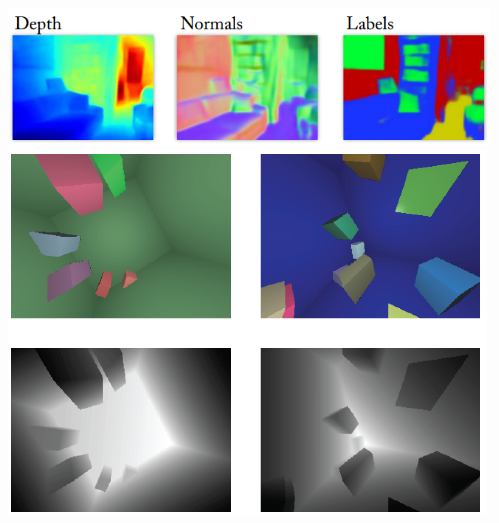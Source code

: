 \documentclass{beamer}
\begin{document}
\begin{frame}
\begin{columns}
\begin{column}{.4\textwidth}
\end{column}
\begin{column}{.6\textwidth}
\includegraphics[width=\linewidth]{segment.png}\\
\includegraphics[width=\linewidth]{stereo.png}
\end{column}
\end{columns}


\end{frame}
\end{document}
